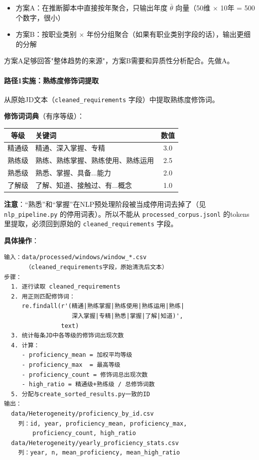 \documentclass[12pt,a4paper]{ctexart}
\begin{document}
\begin{itemize}
\item 方案A：在推断脚本中直接按年聚合，只输出年度 $\bar{\theta}$ 向量（50维 $\times$ 10年 = 500个数字，很小）
\item 方案B：按职业类别 $\times$ 年份分组聚合（如果有职业类别字段的话），输出更细的分解
\end{itemize}

方案A足够回答"整体趋势的来源"，方案B需要和异质性分析配合。先做A。

\paragraph{路径1实施：熟练度修饰词提取}

从原始JD文本（\texttt{cleaned\_requirements} 字段）中提取熟练度修饰词。

\textbf{修饰词词典}（有序等级）：

\begin{table}[h]
\centering
\small
\begin{tabular}{clc}
\toprule
\textbf{等级} & \textbf{关键词} & \textbf{数值} \\
\midrule
精通级 & 精通、深入掌握、专精 & 3.0 \\
熟练级 & 熟练、熟练掌握、熟练使用、熟练运用 & 2.5 \\
熟悉级 & 熟悉、掌握、具备...能力 & 2.0 \\
了解级 & 了解、知道、接触过、有...概念 & 1.0 \\
\bottomrule
\end{tabular}
\end{table}

\textbf{注意}：“熟悉”和“掌握”在NLP预处理阶段被当成停用词去掉了（见 \texttt{nlp\_pipeline.py} 的停用词表）。所以不能从 \texttt{processed\_corpus.jsonl} 的tokens里提取，必须回到原始的 \texttt{cleaned\_requirements} 字段。

\textbf{具体操作}：

\begin{verbatim}
输入：data/processed/windows/window_*.csv
      （cleaned_requirements字段，原始清洗后文本）
步骤：
  1. 逐行读取 cleaned_requirements
  2. 用正则匹配修饰词：
     re.findall(r'(精通|熟练掌握|熟练使用|熟练运用|熟练|
                   深入掌握|专精|熟悉|掌握|了解|知道)',
                text)
  3. 统计每条JD中各等级的修饰词出现次数
  4. 计算：
     - proficiency_mean = 加权平均等级
     - proficiency_max  = 最高等级
     - proficiency_count = 修饰词总出现次数
     - high_ratio = 精通级+熟练级 / 总修饰词数
  5. 分配与create_sorted_results.py一致的ID
输出：
  data/Heterogeneity/proficiency_by_id.csv
    列：id, year, proficiency_mean, proficiency_max,
        proficiency_count, high_ratio
  data/Heterogeneity/yearly_proficiency_stats.csv
    列：year, n, mean_proficiency, mean_high_ratio
\end{verbatim}
\end{document}
